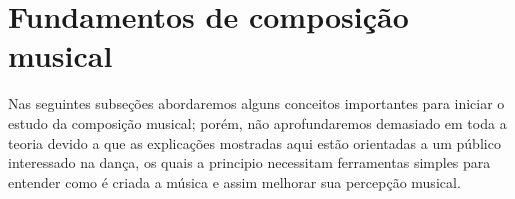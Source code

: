 
\chapter{Fundamentos de composição musical}
\label{cap:musicacomposer}
Nas seguintes subseções abordaremos alguns conceitos importantes para iniciar o estudo da composição musical;
porém, não aprofundaremos demasiado em toda a teoria 
devido a que as explicações mostradas aqui estão
orientadas a um público interessado na dança, os quais a principio necessitam
ferramentas simples para entender como é criada a música e assim melhorar sua percepção musical. 


 
 
 


 



 

 

  
% 

  


